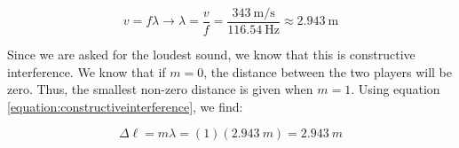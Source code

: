 \begin{mdframed}[backgroundcolor=blue!10!white]
		\begin{equation*}
		v = f \lambda \longrightarrow \lambda = \frac{v}{f} = \frac{\SI[per-mode = symbol]{343}{\m\per\s}}{\SI{116.54}{\Hz}} \approx {\SI{2.943}{\m}} 
		\end{equation*}
		
	Since we are asked for the loudest sound, we know that this is constructive interference. We know that if $m=0$, the distance between the two players will be zero.  Thus, the smallest non-zero distance is given when $m=1$.  Using equation \ref{equation:constructiveinterference}, we find:
		
		\begin{equation*}
			\Delta \ell = m \lambda = (1)(\SI{2.943}{m}) = \SI{2.943}{m}
		\end{equation*}		
	\end{mdframed}
	
	
	
	
	
	
	
	
	
	
	
	
	
	
	
	
	
	
	
		\newpage
	
